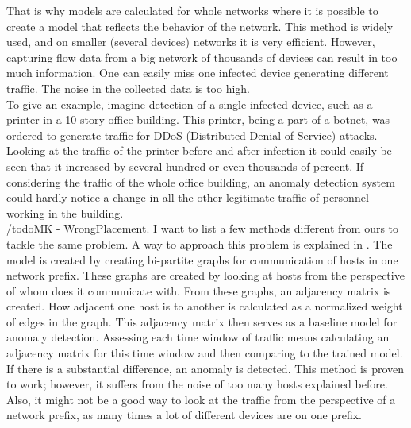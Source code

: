 \documentclass[thesis=B,english]{FITthesis}[2012/10/20]
\begin{document}
That is why models are calculated for whole networks where it is possible to create a model that reflects the behavior of the network.
This method is widely used, and on smaller (several devices) networks it is very efficient.
However, capturing flow data from a big network of thousands of devices can result in too much information.
One can easily miss one infected device generating different traffic.
The noise in the collected data is too high. \\                          
                                                                                  
To give an example, imagine detection of a single infected device, such as a printer in a 10 story office building.
This printer, being a part of a botnet, was ordered to generate traffic for DDoS (Distributed Denial of Service) attacks.
Looking at the traffic of the printer before and after infection it could easily be seen that it increased by several hundred or even thousands of percent.
If considering the traffic of the whole office building, an anomaly detection system could hardly notice a change in all the other legitimate traffic of personnel working in the building. \\
                                                                                  
/todo{MK - WrongPlacement. I want to list a few methods different from ours to tackle the same problem.}
A way to approach this problem is explained in \cite{xu2011network}.              
The model is created by creating bi-partite graphs for communication of hosts in one network prefix.
These graphs are created by looking at hosts from the perspective of whom does it communicate with.
From these graphs, an adjacency matrix is created.                                
How adjacent one host is to another is calculated as a normalized weight of edges in the graph.
This adjacency matrix then serves as a baseline model for anomaly detection.      
Assessing each time window of traffic means calculating an adjacency matrix for this time window and then comparing to the trained model.
If there is a substantial difference, an anomaly is detected.                      
This method is proven to work; however, it suffers from the noise of too many hosts explained before.
Also, it might not be a good way to look at the traffic from the perspective of a network prefix, as many times a lot of different devices are on one prefix. \\
\end{document}
